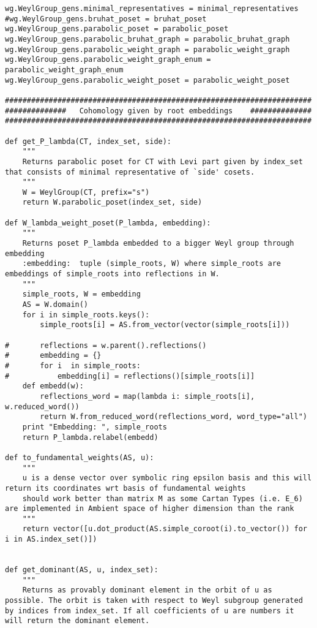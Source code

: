 \begin{verbatim}
wg.WeylGroup_gens.minimal_representatives = minimal_representatives
#wg.WeylGroup_gens.bruhat_poset = bruhat_poset
wg.WeylGroup_gens.parabolic_poset = parabolic_poset
wg.WeylGroup_gens.parabolic_bruhat_graph = parabolic_bruhat_graph
wg.WeylGroup_gens.parabolic_weight_graph = parabolic_weight_graph
wg.WeylGroup_gens.parabolic_weight_graph_enum = parabolic_weight_graph_enum
wg.WeylGroup_gens.parabolic_weight_poset = parabolic_weight_poset

######################################################################
##############   Cohomology given by root embeddings    ##############
######################################################################

def get_P_lambda(CT, index_set, side):
    """
    Returns parabolic poset for CT with Levi part given by index_set that consists of minimal representative of `side' cosets.
    """
    W = WeylGroup(CT, prefix="s")
    return W.parabolic_poset(index_set, side)

def W_lambda_weight_poset(P_lambda, embedding):
    """
    Returns poset P_lambda embedded to a bigger Weyl group through embedding
    :embedding:  tuple (simple_roots, W) where simple_roots are embeddings of simple_roots into reflections in W.
    """
    simple_roots, W = embedding
    AS = W.domain()
    for i in simple_roots.keys():
        simple_roots[i] = AS.from_vector(vector(simple_roots[i]))

#       reflections = w.parent().reflections()
#       embedding = {}
#       for i  in simple_roots:
#           embedding[i] = reflections()[simple_roots[i]]
    def embedd(w):
        reflections_word = map(lambda i: simple_roots[i], w.reduced_word())
        return W.from_reduced_word(reflections_word, word_type="all")
    print "Embedding: ", simple_roots
    return P_lambda.relabel(embedd)

def to_fundamental_weights(AS, u):
    """
    u is a dense vector over symbolic ring epsilon basis and this will return its coordinates wrt basis of fundamental weights
    should work better than matrix M as some Cartan Types (i.e. E_6) are implemented in Ambient space of higher dimension than the rank
    """
    return vector([u.dot_product(AS.simple_coroot(i).to_vector()) for i in AS.index_set()])


def get_dominant(AS, u, index_set):
    """
    Returns as provably dominant element in the orbit of u as possible. The orbit is taken with respect to Weyl subgroup generated by indices from index_set. If all coefficients of u are numbers it will return the dominant element.


\end{verbatim}
